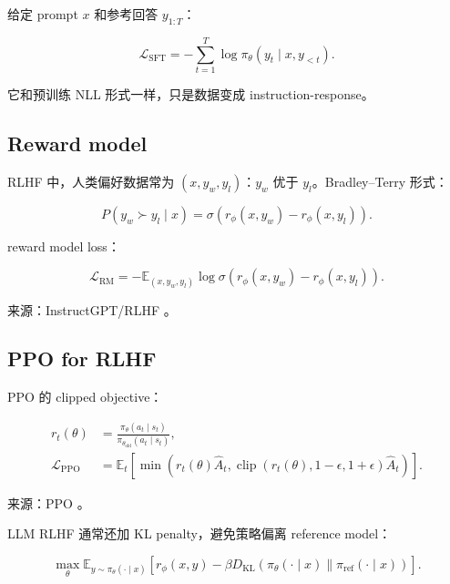 \documentclass[UTF8,12pt]{ctexart}
\newcommand{\E}{\mathbb{E}}
\newcommand{\1}{\mathbf{1}}
\newcommand{\KL}{D_{\mathrm{KL}}}
\newcommand{\clip}{\operatorname{clip}}
\begin{document}
给定 prompt $x$ 和参考回答 $y_{1:T}$：

\begin{equation}
\mathcal{L}_{\mathrm{SFT}}
=-\sum_{t=1}^{T}
\log \pi_\theta(y_t\mid x,y_{<t}).
\label{eq:sft}
\end{equation}

它和预训练 NLL 形式一样，只是数据变成 instruction-response。

\subsection{Reward model}

RLHF 中，人类偏好数据常为 $(x,y_w,y_l)$：$y_w$ 优于 $y_l$。Bradley--Terry 形式：

\begin{equation}
P(y_w\succ y_l\mid x)
=\sigma\left(r_\phi(x,y_w)-r_\phi(x,y_l)\right).
\end{equation}

reward model loss：

\begin{equation}
\mathcal{L}_{\mathrm{RM}}
=-\E_{(x,y_w,y_l)}
\log \sigma\left(r_\phi(x,y_w)-r_\phi(x,y_l)\right).
\label{eq:reward-model}
\end{equation}

来源：InstructGPT/RLHF \cite{ouyang2022instructgpt}。

\subsection{PPO for RLHF}

PPO 的 clipped objective：

\begin{align}
r_t(\theta)
&=\frac{\pi_\theta(a_t\mid s_t)}{\pi_{\theta_{\mathrm{old}}}(a_t\mid s_t)},\\
\mathcal{L}_{\mathrm{PPO}}
&=\E_t\left[
\min\left(
r_t(\theta)\hat{A}_t,
\clip(r_t(\theta),1-\epsilon,1+\epsilon)\hat{A}_t
\right)
\right].
\label{eq:ppo}
\end{align}

来源：PPO \cite{schulman2017ppo}。

LLM RLHF 通常还加 KL penalty，避免策略偏离 reference model：

\begin{equation}
\max_\theta
\E_{y\sim \pi_\theta(\cdot\mid x)}
\left[
r_\phi(x,y)
-\beta \KL\left(\pi_\theta(\cdot\mid x)\|\pi_{\mathrm{ref}}(\cdot\mid x)\right)
\right].
\label{eq:rlhf-kl}
\end{equation}
\end{document}
